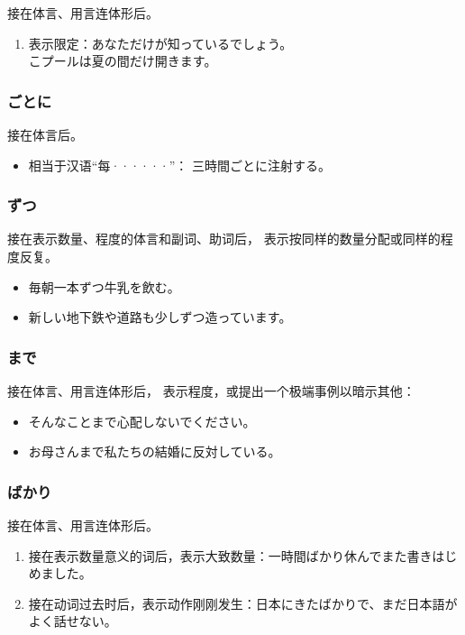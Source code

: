 接在体言、用言连体形后。
\begin{enumerate}
  \item 表示限定：あなただけが知っているでしょう。\\
    こプールは夏の間だけ開きます。
\end{enumerate}


\subsubsection{ごとに}%

接在体言后。
\begin{itemize}
  \item 相当于汉语``每······''： 三時間ごとに注射する。
\end{itemize}


\subsubsection{ずつ}%

接在表示数量、程度的体言和副词、助词后，
表示按同样的数量分配或同样的程度反复。
\begin{itemize}
  \item 毎朝一本ずつ牛乳を飲む。
  \item 新しい地下鉄や道路も少しずつ造っています。
\end{itemize}


\subsubsection{まで}%

接在体言、用言连体形后，
表示程度，或提出一个极端事例以暗示其他：
\begin{itemize}
  \item そんなことまで心配しないでください。
  \item お母さんまで私たちの結婚に反対している。
\end{itemize}


\subsubsection{ばかり}%

接在体言、用言连体形后。
\begin{enumerate}
  \item 接在表示数量意义的词后，表示大致数量：一時間ばかり休んでまた書きはじめました。
  \item 接在动词过去时后，表示动作刚刚发生：日本にきたばかりで、まだ日本語がよく話せない。
\end{enumerate}



